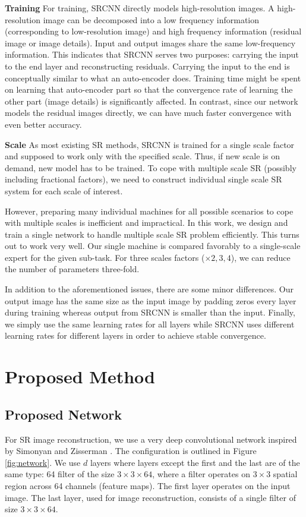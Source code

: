 \documentclass[10pt,twocolumn,letterpaper]{article}
\begin{document}
\textbf{Training}
For training, SRCNN directly models high-resolution images. A high-resolution image can be decomposed into a low frequency information (corresponding to low-resolution image) and high frequency information (residual image or image details). Input and output images share the same low-frequency information. This indicates that SRCNN  serves two purposes: carrying the input to the end layer and reconstructing residuals. Carrying the input to the end is conceptually similar to what an auto-encoder does. Training time might be spent on learning that auto-encoder part so that the convergence rate of learning the other part (image details) is significantly affected. In contrast, since our network models the residual images directly, we can have much faster convergence with even better accuracy.

\textbf{Scale} As most existing SR methods, SRCNN is trained for a single scale factor and supposed to work only with the specified scale. Thus, if new scale is on demand, new model has to be trained. To cope with multiple scale SR (possibly including fractional factors), we need to construct individual single scale SR system for each scale of interest.

However, preparing many individual machines for all possible scenarios to cope with multiple scales is inefficient and impractical.
In this work, we design and train a single network to handle multiple scale SR problem efficiently. This turns out to work very well. Our single machine is compared favorably to a single-scale expert for the given sub-task. For three scales factors ($\times 2,3,4$), we can reduce the number of parameters three-fold.


In addition to the aforementioned issues, there are some minor differences. Our output image has the same size as the input image by padding zeros every layer during training whereas output from SRCNN is smaller than the input. Finally, we simply use the same learning rates for all layers while SRCNN uses different learning rates for different layers in order to achieve stable convergence.

\section{Proposed Method}
\subsection{Proposed Network}

For SR image reconstruction, we use a very deep convolutional network inspired by Simonyan and Zisserman \cite{simonyan2015very}. The configuration is outlined in Figure \ref{fig:network}. We use $d$ layers where layers except the first and the last are of the same type: 64 filter of the size $3\times 3 \times64$, where a filter operates on $3\times3$ spatial region across 64 channels (feature maps). The first layer operates on the input image. The last layer, used for image reconstruction, consists of a single filter of size $3\times 3 \times64$.
\end{document}
